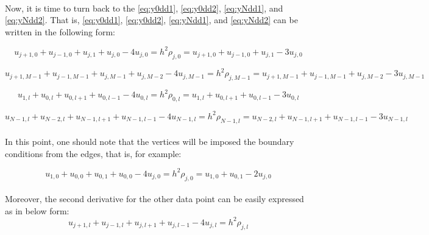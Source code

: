\documentclass[letterpaper,12pt]{article}
\begin{document}
\paragraph{} Now, it is time to turn back to the \eqref{eq:y0dd1}, \eqref{eq:y0dd2}, \eqref{eq:yNdd1}, and \eqref{eq:yNdd2}. That is, \eqref{eq:y0dd1}, \eqref{eq:y0dd2}, \eqref{eq:yNdd1}, and \eqref{eq:yNdd2} can be written in the following form:

\begin{equation*}
    u_{j+1,0} + u_{j-1,0} + u_{j,1} + u_{j,0} -4u_{j,0} = h^2\rho_{j,0} = u_{j+1,0} + u_{j-1,0} + u_{j,1} -3u_{j,0}
\end{equation*}

\begin{equation*}
    u_{j+1,M-1} + u_{j-1,M-1} + u_{j,M-1} + u_{j,M - 2} -4u_{j,M-1} = h^2\rho_{j,M-1} = u_{j+1,M-1} + u_{j-1,M-1} + u_{j,M - 2} -3u_{j,M-1} 
\end{equation*}

\begin{equation*}
    u_{1,l} + u_{0,l} + u_{0,l + 1} + u_{0,l - 1} -4u_{0,l} = h^2\rho_{0,l} = u_{1,l} + u_{0,l + 1} + u_{0,l - 1} -3u_{0,l} 
\end{equation*}

\begin{equation*}
    u_{N-1,l} + u_{N-2,l} + u_{N-1,l + 1} + u_{N-1,l - 1} -4u_{N-1,l} = h^2\rho_{N-1,l} = u_{N-2,l} + u_{N-1,l + 1} + u_{N-1,l - 1} -3u_{N-1,l}
\end{equation*}

\paragraph{} In this point, one should note that the vertices will be imposed the boundary conditions from the edges, that is, for example:

\begin{equation*}
    u_{1,0} + u_{0,0} + u_{0,1} + u_{0,0} -4u_{j,0} = h^2\rho_{j,0} =  u_{1,0} + u_{0,1} -2u_{j,0}
\end{equation*}

\paragraph{} Moreover, the second derivative for the other data point can be easily expressed as in below form:
\begin{equation*}
    \label{eq:gendd}
    u_{j+1,l} + u_{j-1,l} + u_{j,l + 1} + u_{j,l - 1} -4u_{j,l} = h^2\rho_{j,l} 
\end{equation*}
\end{document}
